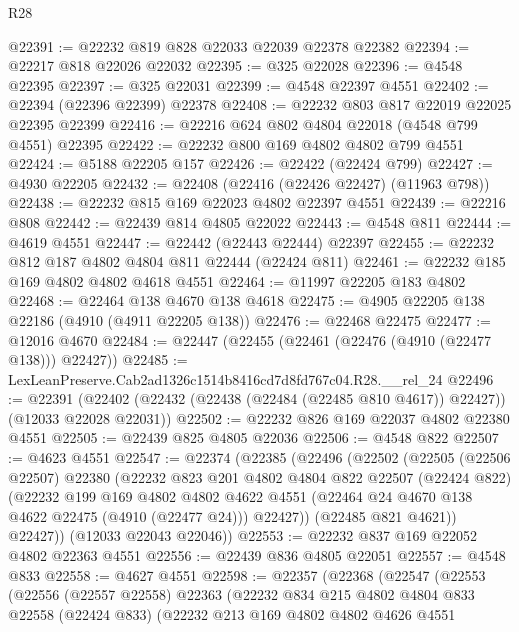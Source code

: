 \begin{lexlean}{R28}
\begin{coremodule}
@22391 := @22232 @819 @828 @22033 @22039 @22378 @22382
@22394 := @22217 @818 @22026 @22032
@22395 := @325 @22028
@22396 := @4548 @22395
@22397 := @325 @22031
@22399 := @4548 @22397 @4551
@22402 := @22394 (@22396 @22399) @22378
@22408 := @22232 @803 @817 @22019 @22025 @22395 @22399
@22416 := @22216 @624 @802 @4804 @22018 (@4548 @799 @4551) @22395
@22422 := @22232 @800 @169 @4802 @4802 @799 @4551
@22424 := @5188 @22205 @157
@22426 := @22422 (@22424 @799)
@22427 := @4930 @22205
@22432 := @22408 (@22416 (@22426 @22427) (@11963 @798))
@22438 := @22232 @815 @169 @22023 @4802 @22397 @4551
@22439 := @22216 @808
@22442 := @22439 @814 @4805 @22022
@22443 := @4548 @811
@22444 := @4619 @4551
@22447 := @22442 (@22443 @22444) @22397
@22455 := @22232 @812 @187 @4802 @4804 @811 @22444 (@22424 @811)
@22461 := @22232 @185 @169 @4802 @4802 @4618 @4551
@22464 := @11997 @22205 @183 @4802
@22468 := @22464 @138 @4670 @138 @4618
@22475 := @4905 @22205 @138 @22186 (@4910 (@4911 @22205 @138))
@22476 := @22468 @22475
@22477 := @12016 @4670
@22484 := @22447 (@22455 (@22461 (@22476 (@4910 (@22477 @138))) @22427))
@22485 := LexLeanPreserve.Cab2ad1326c1514b8416cd7d8fd767c04.R28.__rel_24
@22496 := @22391
    (@22402 (@22432 (@22438 (@22484 (@22485 @810 @4617)) @22427)) (@12033 @22028 @22031))
@22502 := @22232 @826 @169 @22037 @4802 @22380 @4551
@22505 := @22439 @825 @4805 @22036
@22506 := @4548 @822
@22507 := @4623 @4551
@22547 := @22374
    (@22385
      (@22496
        (@22502
          (@22505
            (@22506 @22507)
            @22380
            (@22232
              @823
              @201
              @4802
              @4804
              @822
              @22507
              (@22424 @822)
              (@22232
                @199
                @169
                @4802
                @4802
                @4622
                @4551
                (@22464 @24 @4670 @138 @4622 @22475 (@4910 (@22477 @24)))
                @22427))
            (@22485 @821 @4621))
          @22427))
      (@12033 @22043 @22046))
@22553 := @22232 @837 @169 @22052 @4802 @22363 @4551
@22556 := @22439 @836 @4805 @22051
@22557 := @4548 @833
@22558 := @4627 @4551
@22598 := @22357
    (@22368
      (@22547
        (@22553
          (@22556
            (@22557 @22558)
            @22363
            (@22232
              @834
              @215
              @4802
              @4804
              @833
              @22558
              (@22424 @833)
              (@22232
                @213
                @169
                @4802
                @4802
                @4626
                @4551

\end{coremodule}
\end{lexlean}
